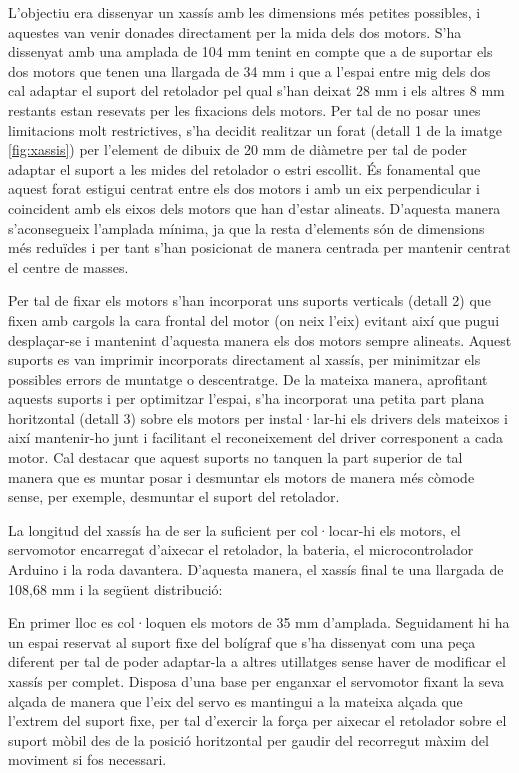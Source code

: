 L’objectiu era dissenyar un xassís amb les dimensions més petites possibles, i aquestes van venir donades directament per la mida dels dos motors. S’ha dissenyat  amb una amplada de 104 mm tenint en compte que a de suportar els dos motors que tenen una llargada de 34 mm i que a l’espai entre mig dels dos cal adaptar el suport del retolador pel qual s'han deixat 28 mm i els altres 8 mm restants estan resevats per les fixacions dels motors. Per tal de no posar unes limitacions molt restrictives, s’ha decidit realitzar un forat (detall 1 de la imatge \ref{fig:xassis}) per l’element de dibuix de 20 mm de diàmetre per tal de poder adaptar el suport a les mides del retolador o estri escollit. És fonamental que aquest forat estigui centrat entre els dos motors i amb un eix perpendicular i coincident amb els eixos dels motors que han d’estar alineats. D’aquesta manera s’aconsegueix l’amplada mínima, ja que la resta d’elements són de dimensions més reduïdes i per tant s’han posicionat de manera centrada per mantenir centrat el centre de masses. 

Per tal de fixar els motors s’han incorporat uns suports verticals (detall 2) que fixen amb cargols la cara frontal del motor (on neix l’eix) evitant així que pugui desplaçar-se i mantenint d’aquesta manera els dos motors sempre alineats. Aquest suports es van imprimir incorporats directament al xassís, per minimitzar els possibles errors de muntatge o descentratge. De la mateixa manera, aprofitant aquests suports i per optimitzar l’espai, s’ha incorporat una petita part plana horitzontal (detall 3) sobre els motors per instal·lar-hi els drivers dels mateixos i així mantenir-ho junt i facilitant el reconeixement del driver corresponent a cada motor. Cal destacar que aquest suports no tanquen la part superior de tal manera que es muntar posar i desmuntar els motors de manera més còmode sense, per exemple, desmuntar el suport del retolador. 

La longitud del xassís ha de ser la suficient per col·locar-hi els motors, el servomotor encarregat d’aixecar el retolador, la bateria, el microcontrolador Arduino i la roda davantera. D’aquesta manera, el xassís final te una llargada de 108,68 mm i la següent distribució: 

En primer lloc es col·loquen els motors de 35 mm d'amplada. Seguidament hi ha un espai reservat al suport fixe del bolígraf que s’ha dissenyat com una peça diferent per tal de poder adaptar-la a altres utillatges sense haver de modificar el xassís per complet. Disposa d’una base per enganxar el servomotor fixant la seva alçada de manera que l’eix del servo es mantingui a la mateixa alçada que l’extrem del suport fixe, per tal d’exercir la força per aixecar el retolador sobre el suport mòbil des de la posició horitzontal per gaudir del recorregut màxim del moviment si fos necessari. 

